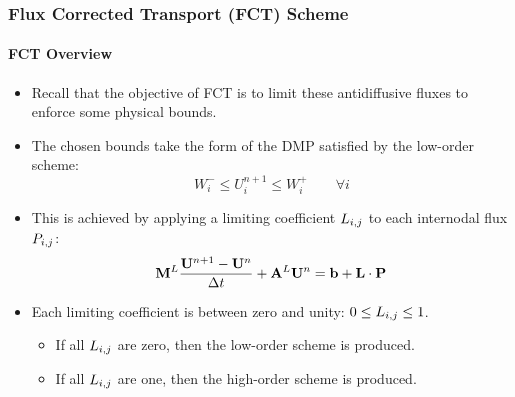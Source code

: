 \documentclass{beamer}
\begin{document}
\begin{frame}
\frametitle{Flux Corrected Transport (FCT) Scheme}
\framesubtitle{FCT Overview}

\begin{itemize}
   \item Recall that the objective of FCT is to limit these antidiffusive
      fluxes to enforce some physical bounds.
   \item The chosen bounds take the form of the DMP satisfied by the
      low-order scheme:
      \begin{equation}
         W_i^-\leq
         U_i^{n+1}\leq
         W_i^+\qquad\forall i
      \end{equation}
   \item This is achieved by applying a limiting coefficient $L_{i,j}$ to each
      internodal flux $\correctionfluxij$:
      \begin{equation}
        \lumpedmassmatrix\frac{\solutionvector^{n+1}-\solutionvector^n}{\dt}
          + \ssmatrix^L\solutionvector^n = \ssrhs
          + \limitermatrix\cdot\correctionfluxmatrix
      \end{equation}
   \item Each limiting coefficient is between zero and unity: $0\leq L_{i,j}\leq 1$.
   \begin{itemize}
      \item If all $L_{i,j}$ are zero, then the low-order scheme is produced.
      \item If all $L_{i,j}$ are one, then the high-order scheme is produced.
   \end{itemize}
\end{itemize}

\end{frame}
\end{document}
